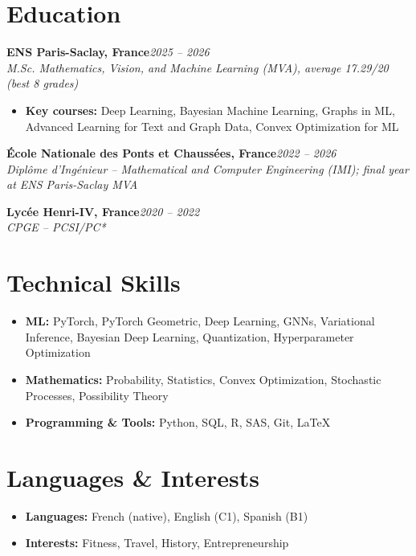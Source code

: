 \documentclass[11pt,a4paper]{article}
\newlength{\entrygap}      \setlength{\entrygap}{4pt}
\newlength{\subentrygap}   \setlength{\subentrygap}{2.5pt}
\newcommand{\cventry}[3]{%
  \noindent\textbf{#1}\hfill\textit{#2}\\
  \textit{#3}%
}
\newcommand{\entrysep}{\vspace{\entrygap}}
\newcommand{\bulletsep}{\vspace{\subentrygap}}
\begin{document}
\section*{Education}

\cventry{ENS Paris-Saclay, France}{2025 -- 2026}{M.Sc. Mathematics, Vision, and Machine Learning (MVA), average 17.29/20 (best 8 grades)}
\bulletsep
\begin{itemize}
  \item \textbf{Key courses:} Deep Learning, Bayesian Machine Learning, Graphs in ML, Advanced Learning for Text and Graph Data, Convex Optimization for ML
\end{itemize}
\entrysep

\cventry{\'Ecole Nationale des Ponts et Chauss\'ees, France}{2022 -- 2026}{Dipl\^ome d’Ing\'enieur -- Mathematical and Computer Engineering (IMI); final year at ENS Paris-Saclay MVA}
\entrysep

\cventry{Lyc\'ee Henri-IV, France}{2020 -- 2022}{CPGE -- PCSI/PC*}

\section*{Technical Skills}
\begin{itemize}
  \item \textbf{ML:} PyTorch, PyTorch Geometric, Deep Learning, GNNs, Variational Inference, Bayesian Deep Learning, Quantization, Hyperparameter Optimization
  \item \textbf{Mathematics:} Probability, Statistics, Convex Optimization, Stochastic Processes, Possibility Theory
  \item \textbf{Programming \& Tools:} Python, SQL, R, SAS, Git, \LaTeX
\end{itemize}

\section*{Languages \& Interests}
\begin{itemize}
  \item \textbf{Languages:} French (native), English (C1), Spanish (B1)
  \item \textbf{Interests:} Fitness, Travel, History, Entrepreneurship
\end{itemize}
\end{document}
